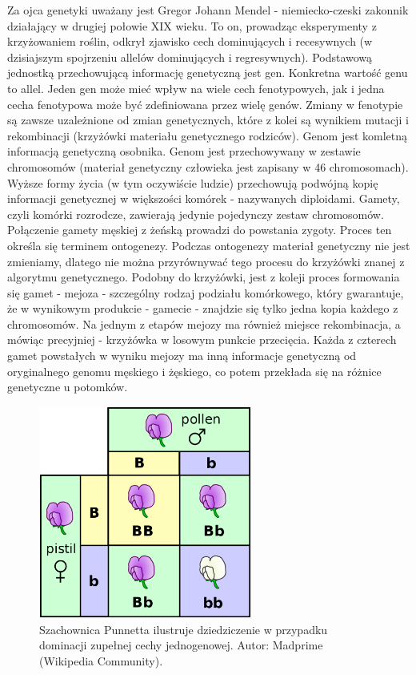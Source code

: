 \documentclass[a4paper,11pt]{article}
\begin{document}
    Za ojca genetyki uważany jest Gregor Johann Mendel - niemiecko-czeski zakonnik działający w drugiej połowie XIX wieku. To on, prowadząc eksperymenty z krzyżowaniem roślin, odkrył zjawisko cech dominujących i recesywnych (w dzisiajszym spojrzeniu allelów dominujących i regresywnych). Podstawową jednostką przechowującą informację genetyczną jest gen. Konkretna wartość genu to allel. Jeden gen może mieć wpływ na wiele cech fenotypowych, jak i jedna cecha fenotypowa może być zdefiniowana przez wielę genów. Zmiany w fenotypie są zawsze uzależnione od zmian genetycznych, które z kolei są wynikiem mutacji i rekombinacji (krzyżówki materiału genetycznego rodziców). Genom jest komletną informacją genetyczną osobnika. Genom jest przechowywany w zestawie chromosomów (materiał genetyczny człowieka jest zapisany w 46 chromosomach). Wyższe formy życia (w tym oczywiście ludzie) przechowują podwójną kopię informacji genetycznej w większości komórek - nazywanych diploidami. Gamety, czyli komórki rozrodcze, zawierają jedynie pojedynczy zestaw chromosomów. Połączenie gamety męskiej z żeńską prowadzi do powstania zygoty. Proces ten określa się terminem ontogenezy. Podczas ontogenezy materiał genetyczny nie jest zmieniamy, dlatego nie można przyrównywać tego procesu do krzyżówki znanej z algorytmu genetycznego. Podobny do krzyżówki, jest z koleji proces formowania się gamet - mejoza - szczególny rodzaj podziału komórkowego, który gwarantuje, że w wynikowym produkcie - gamecie - znajdzie się tylko jedna kopia każdego z chromosomów. Na jednym z etapów mejozy ma również miejsce rekombinacja, a mówiąc precyjniej - krzyżówka w losowym punkcie przecięcia. Każda z czterech gamet powstałych w wyniku mejozy ma inną informacje genetyczną od oryginalnego genomu męskiego i żęskiego, co potem przekłada się na różnice genetyczne u potomków\cite{IntroductionToEvolutionaryComputing2015}.

    \bigskip

    \begin{figure}[H]
        \label{fig:punnett_squre_mendel}
        \centering
        \includegraphics[width=7cm]{punnett_squre_mendel}
        \caption{Szachownica Punnetta ilustruje dziedziczenie w przypadku dominacji zupełnej cechy jednogenowej. Autor: Madprime (Wikipedia Community).}
    \end{figure}
\end{document}
